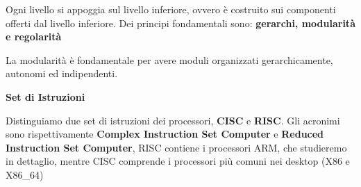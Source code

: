Ogni livello si appoggia sul livello inferiore, ovvero è costruito sui componenti offerti dal livello inferiore. Dei principi fondamentali sono: \textbf{gerarchi, modularità e regolarità}

La modularità è fondamentale per avere moduli organizzati gerarchicamente, autonomi ed indipendenti.


\begin{defn}
	\textbf{Set di Istruzioni}
	
	Distinguiamo due set di istruzioni dei processori, \textbf{CISC} e \textbf{RISC}. Gli acronimi sono rispettivamente \textbf{Complex Instruction Set Computer} e \textbf{Reduced Instruction Set Computer}, RISC contiene i processori ARM, che studieremo in dettaglio, mentre CISC comprende i processori più comuni nei desktop (X86 e X86\_64)
\end{defn}

